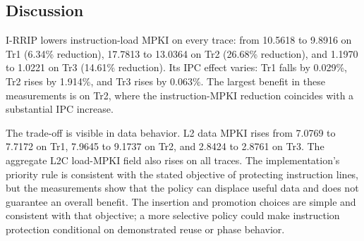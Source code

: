 
\subsection{Discussion}
I-RRIP lowers instruction-load MPKI on every trace: from 10.5618 to 9.8916 on Tr1 (6.34\% reduction), 17.7813 to 13.0364 on Tr2 (26.68\% reduction), and 1.1970 to 1.0221 on Tr3 (14.61\% reduction). Its IPC effect varies: Tr1 falls by 0.029\%, Tr2 rises by 1.914\%, and Tr3 rises by 0.063\%. The largest benefit in these measurements is on Tr2, where the instruction-MPKI reduction coincides with a substantial IPC increase.

The trade-off is visible in data behavior. L2 data MPKI rises from 7.0769 to 7.7172 on Tr1, 7.9645 to 9.1737 on Tr2, and 2.8424 to 2.8761 on Tr3. The aggregate L2C load-MPKI field also rises on all traces. The implementation's priority rule is consistent with the stated objective of protecting instruction lines, but the measurements show that the policy can displace useful data and does not guarantee an overall benefit. The insertion and promotion choices are simple and consistent with that objective; a more selective policy could make instruction protection conditional on demonstrated reuse or phase behavior.
